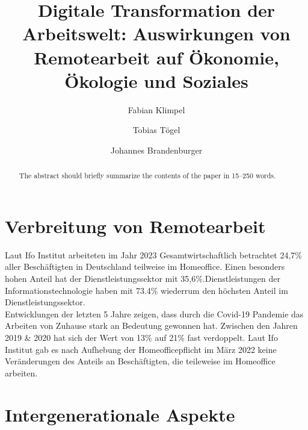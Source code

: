 \documentclass[runningheads]{llncs}
\begin{document}
\title{Digitale Transformation der Arbeitswelt: Auswirkungen von Remotearbeit auf Ökonomie, Ökologie und Soziales}


\author{Fabian Klimpel\orcidID{} \and
Tobias Tögel\orcidID{} \and
Johannes Brandenburger\orcidID{}}
%


\maketitle

\begin{abstract}
The abstract should briefly summarize the contents of the paper in
15--250 words.


\end{abstract}

\section{Verbreitung von Remotearbeit}
Laut Ifo Institut arbeiteten im Jahr 2023 Gesamtwirtschaftlich betrachtet 24,7\% aller Beschäftigten in Deutschland teilweise im Homeoffice\cite{ifo23}. Einen besonders hohen Anteil hat der Dienstleistungssektor mit 35,6\%\cite{ifo23}.Dienstleistungen der Informationstechnologie haben mit 73.4\% wiederrum den höchsten Anteil im Dienstleistungssektor\cite{ifo23}.\\
Entwicklungen der letzten 5 Jahre zeigen, dass durch die Covid-19 Pandemie das Arbeiten von Zuhause stark an Bedeutung gewonnen hat. Zwischen den Jahren 2019 \& 2020 hat sich der Wert von 13\% auf 21\% fast verdoppelt\cite{statis23}. Laut Ifo Institut gab es nach Aufhebung der Homeofficepflicht im März 2022 keine Veränderungen des Anteils an Beschäftigten, die teileweise im Homeoffice arbeiten\cite{ifo23}.

\section{Intergenerationale Aspekte}
\end{document}
